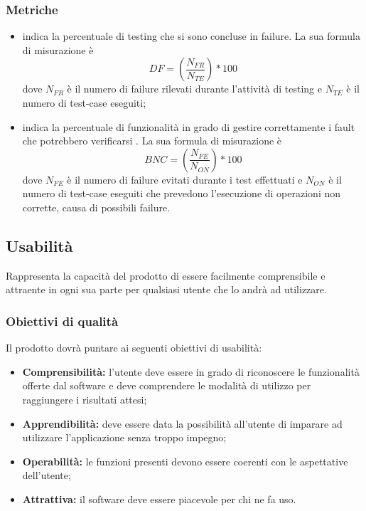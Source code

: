 \documentclass[PianoDiQualifica.tex]{subfiles}
\begin{document}
\subsubsection{Metriche}
\begin{itemize}
	\item {} indica la percentuale di testing che si sono concluse in failure. La sua formula di misurazione è \[DF=(\frac{N_{FR}}{N_{TE}})*100\] dove $ N_{FR} $ è il numero di failure rilevati durante l'attività di testing e $ N_{TE} $ è il numero di test-case eseguiti;
	\item {} indica la percentuale di funzionalità in grado di gestire correttamente i fault che potrebbero verificarsi . La sua formula di misurazione è \[BNC=(\frac{N_{FE}}{N_{ON}})*100\] dove $ N_{FE} $ è il numero di failure evitati durante i test effettuati e $ N_{ON} $ è il numero di test-case eseguiti che prevedono l'esecuzione di operazioni non corrette, causa di possibili failure.
\end{itemize}
\subsection{Usabilità}
Rappresenta la capacità del prodotto di essere facilmente comprensibile e attraente in ogni sua parte per qualsiasi utente che lo andrà ad utilizzare.
\subsubsection{Obiettivi di qualità}
Il prodotto dovrà puntare ai seguenti obiettivi di usabilità:
\begin{itemize}
	\item \textbf{Comprensibilità:} l'utente deve essere in grado di riconoscere le funzionalità offerte dal software e deve comprendere le modalità di utilizzo per raggiungere i risultati attesi;
	\item \textbf{Apprendibilità:} deve essere data la possibilità all'utente di imparare ad utilizzare l'applicazione senza troppo impegno;
	\item \textbf{Operabilità:} le funzioni presenti devono essere coerenti con le aspettative dell'utente;
	\item \textbf{Attrattiva:} il software deve essere piacevole per chi ne fa uso.
\end{itemize}
\end{document}
